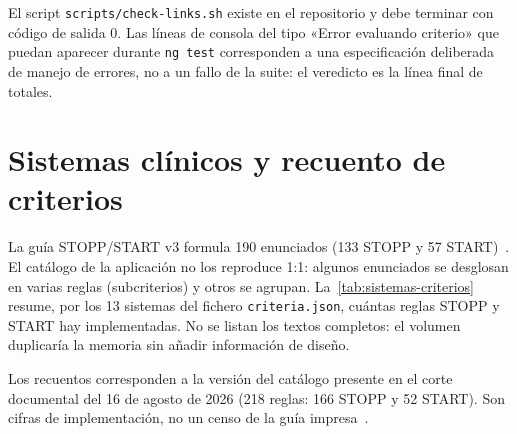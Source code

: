 El script \texttt{scripts/check-links.sh} existe en el repositorio y
debe terminar con código de salida 0. Las líneas de consola del tipo
«Error evaluando criterio» que puedan aparecer durante
\texttt{ng test} corresponden a una especificación deliberada de manejo
de errores, no a un fallo de la suite: el veredicto es la línea final
de totales.

\chapter{Sistemas clínicos y recuento de criterios}
\label{anexo:sistemas}

La guía STOPP/START v3 formula 190 enunciados (133 STOPP y 57
START)~\cite{omahony2023stopp}. El catálogo de la aplicación no los
reproduce 1:1: algunos enunciados se desglosan en varias reglas
(subcriterios) y otros se agrupan. La~\cref{tab:sistemas-criterios}
resume, por los 13 sistemas del fichero \texttt{criteria.json}, cuántas
reglas STOPP y START hay implementadas. No se listan los textos
completos: el volumen duplicaría la memoria sin añadir información de
diseño.

Los recuentos corresponden a la versión del catálogo presente en el corte
documental del 16 de agosto de 2026 (218 reglas: 166 STOPP y 52 START). Son cifras de
implementación, no un censo de la guía impresa~\cite{sacyl2023stopp}.

